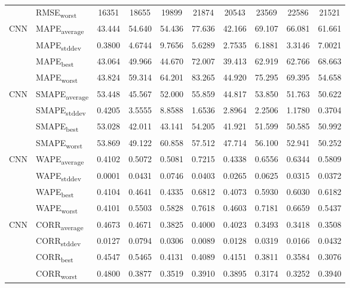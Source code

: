 {\begin{longtable}{l l c c c c c c c c}
 & RMSE\textsubscript{worst} & 16351 & 18655 & 19899 & 21874 & 20543 & 23569 & 22586 & 21521 \\
\cmidrule(lr){2-10}
\multirow{4}{*}{CNN} & MAPE\textsubscript{average} & 43.444 & 54.640 & 54.436 & 77.636 & 42.166 & 69.107 & 66.081 & 61.661 \\
 & MAPE\textsubscript{stddev} & 0.3800 & 4.6744 & 9.7656 & 5.6289 & 2.7535 & 6.1881 & 3.3146 & 7.0021 \\
 & MAPE\textsubscript{best} & 43.064 & 49.966 & 44.670 & 72.007 & 39.413 & 62.919 & 62.766 & 68.663 \\
 & MAPE\textsubscript{worst} & 43.824 & 59.314 & 64.201 & 83.265 & 44.920 & 75.295 & 69.395 & 54.658 \\
\cmidrule(lr){2-10}
\multirow{4}{*}{CNN} & SMAPE\textsubscript{average} & 53.448 & 45.567 & 52.000 & 55.859 & 44.817 & 53.850 & 51.763 & 50.622 \\
 & SMAPE\textsubscript{stddev} & 0.4205 & 3.5555 & 8.8588 & 1.6536 & 2.8964 & 2.2506 & 1.1780 & 0.3704 \\
 & SMAPE\textsubscript{best} & 53.028 & 42.011 & 43.141 & 54.205 & 41.921 & 51.599 & 50.585 & 50.992 \\
 & SMAPE\textsubscript{worst} & 53.869 & 49.122 & 60.858 & 57.512 & 47.714 & 56.100 & 52.941 & 50.252 \\
\cmidrule(lr){2-10}
\multirow{4}{*}{CNN} & WAPE\textsubscript{average} & 0.4102 & 0.5072 & 0.5081 & 0.7215 & 0.4338 & 0.6556 & 0.6344 & 0.5809 \\
 & WAPE\textsubscript{stddev} & 0.0001 & 0.0431 & 0.0746 & 0.0403 & 0.0265 & 0.0625 & 0.0315 & 0.0372 \\
 & WAPE\textsubscript{best} & 0.4104 & 0.4641 & 0.4335 & 0.6812 & 0.4073 & 0.5930 & 0.6030 & 0.6182 \\
 & WAPE\textsubscript{worst} & 0.4101 & 0.5503 & 0.5828 & 0.7618 & 0.4603 & 0.7181 & 0.6659 & 0.5437 \\
\cmidrule(lr){2-10}
\multirow{4}{*}{CNN} & CORR\textsubscript{average} & 0.4673 & 0.4671 & 0.3825 & 0.4000 & 0.4023 & 0.3493 & 0.3418 & 0.3508 \\
 & CORR\textsubscript{stddev} & 0.0127 & 0.0794 & 0.0306 & 0.0089 & 0.0128 & 0.0319 & 0.0166 & 0.0432 \\
 & CORR\textsubscript{best} & 0.4547 & 0.5465 & 0.4131 & 0.4089 & 0.4151 & 0.3811 & 0.3584 & 0.3076 \\
 & CORR\textsubscript{worst} & 0.4800 & 0.3877 & 0.3519 & 0.3910 & 0.3895 & 0.3174 & 0.3252 & 0.3940 \\

\end{longtable}}
